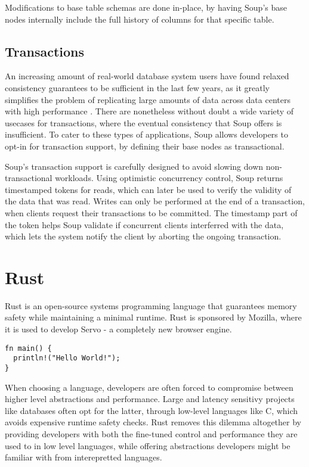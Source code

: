 \documentclass[b5paper]{report}
\begin{document}
Modifications to base table schemas are done in-place, by having Soup's base
nodes internally include the full history of columns for that specific table.

\subsection{Transactions}
An increasing amount of real-world database system users have found relaxed
consistency guarantees to be sufficient in the last few years, as it greatly
simplifies the problem of replicating large amounts of data across data centers
with high performance \cite{existential}. There are nonetheless without doubt
a wide variety of usecases for transactions, where the eventual consistency that
Soup offers is insufficient. To cater to these types of applications, Soup
allows developers to opt-in for transaction support, by defining their base
nodes as transactional.

Soup's transaction support is carefully designed to avoid slowing down
non-transactional workloads. Using optimistic concurrency control, Soup returns
timestamped tokens for reads, which can later be used to verify the validity of
the data that was read. Writes can only be performed at the end of a
transaction, when clients request their transactions to be committed. The
timestamp part of the token helps Soup validate if concurrent clients
interferred with the data, which lets the system notify the client by aborting
the ongoing transaction.

\section{Rust}
Rust is an open-source systems programming language that guarantees memory
safety while maintaining a minimal runtime. Rust is sponsored by Mozilla, where
it is used to develop Servo - a completely new browser engine.

\begin{lstlisting}[caption="Hello World in Rust"]
fn main() {
  println!("Hello World!");
}
\end{lstlisting}

When choosing a language, developers are often forced to compromise between
higher level abstractions and performance. Large and latency sensitivy projects
like databases often opt for the latter, through low-level languages like C,
which avoids expensive runtime safety checks. Rust removes this dilemma
altogether by providing developers with both the fine-tuned control and
performance they are used to in low level languages, while offering abstractions
developers might be familiar with from interepretted languages.
\end{document}
